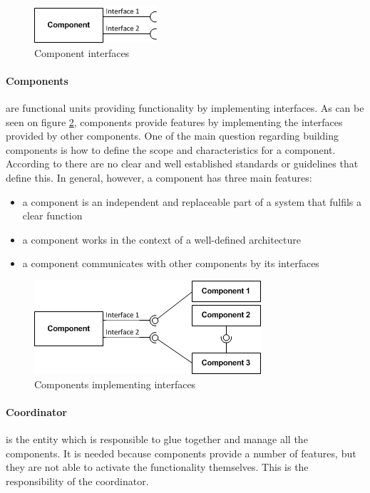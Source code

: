 	\begin{figure}[h!]
  		\centering
  		\includegraphics[scale=0.75]{plug-in/component-interfaces.png}
  		\caption{Component interfaces }
  		\label{fig_intf}
	\end{figure}

\paragraph{Components}
	are functional units providing functionality by implementing interfaces. As can be seen on figure \ref{fig_comp}, components provide  features by implementing the interfaces provided by other components. One of the main question regarding building components is how to define the scope and characteristics for a component. According to \cite{cai2000component} there are no clear and well established standards or guidelines that define this. In general, however, a component has three main features: 

\begin{itemize}
	\item a component is an independent and replaceable part of a system that fulfils a clear function
	\item a component works in the context of a well-defined architecture
	\item a component communicates with other components by its interfaces 
\end{itemize}

	\begin{figure}[h!]
  		\centering
  		\includegraphics[scale=0.75]{plug-in/component-services.png}
  		\caption{Components implementing interfaces }
  		\label{fig_comp}
	\end{figure}

\paragraph{Coordinator}
	is the entity which is responsible to glue together and manage all the components. It is needed because components provide a number of features, but they are not able to activate the functionality themselves. This is the responsibility of the coordinator.

